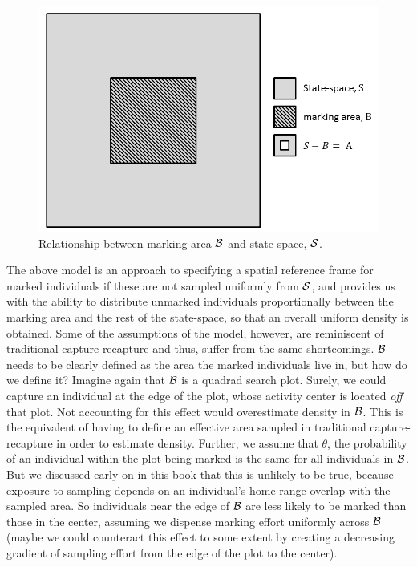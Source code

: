 \begin{figure}[ht]
\begin{center}
\includegraphics[width=5in]{Ch19-PartialID/figs/scrPIDBox.png}
\end{center}
\caption{
Relationship between marking area ${\cal B}$ and state-space, ${\cal S}$.
}
\label{partialID.fig.Box}
\end{figure}

The above %
model is an approach to specifying a spatial reference frame for
marked individuals if these are not sampled uniformly from ${\cal S}$,
and provides us with the ability to distribute unmarked individuals
proportionally between the marking area and the rest of the state-space, so that an overall uniform density is obtained. Some of the assumptions of the model, however, are reminiscent of traditional capture-recapture and thus, suffer from the same shortcomings. ${\cal B}$ needs to be clearly defined as the area the marked individuals live in, but how do we define it? Imagine again that ${\cal B}$ is a quadrad search plot. Surely, we could capture an individual at the edge of the plot, whose activity center is located \emph{off} that plot. Not accounting for this effect would overestimate density in ${\cal B}$. This is the equivalent of  having to define an effective area sampled in traditional capture-recapture in order to estimate density. Further, we assume that $\theta$, the probability of an individual within the plot being marked is the same for all individuals in ${\cal B}$. But we discussed early on in this book that this is unlikely to be true, because exposure to sampling depends on an individual's home range overlap with the sampled area. So individuals near the edge of ${\cal B}$ are less likely to be marked than those in the center, assuming we dispense marking effort uniformly across ${\cal B}$ (maybe we could counteract this effect to some extent by creating a decreasing gradient of sampling effort from the edge of the plot to the center).

